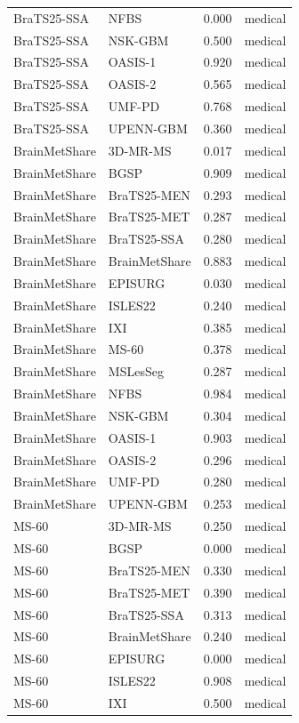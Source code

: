 \begin{tabular}{llrl}
BraTS25-SSA & NFBS & 0.000 & medical \\
BraTS25-SSA & NSK-GBM & 0.500 & medical \\
BraTS25-SSA & OASIS-1 & 0.920 & medical \\
BraTS25-SSA & OASIS-2 & 0.565 & medical \\
BraTS25-SSA & UMF-PD & 0.768 & medical \\
BraTS25-SSA & UPENN-GBM & 0.360 & medical \\
BrainMetShare & 3D-MR-MS & 0.017 & medical \\
BrainMetShare & BGSP & 0.909 & medical \\
BrainMetShare & BraTS25-MEN & 0.293 & medical \\
BrainMetShare & BraTS25-MET & 0.287 & medical \\
BrainMetShare & BraTS25-SSA & 0.280 & medical \\
BrainMetShare & BrainMetShare & 0.883 & medical \\
BrainMetShare & EPISURG & 0.030 & medical \\
BrainMetShare & ISLES22 & 0.240 & medical \\
BrainMetShare & IXI & 0.385 & medical \\
BrainMetShare & MS-60 & 0.378 & medical \\
BrainMetShare & MSLesSeg & 0.287 & medical \\
BrainMetShare & NFBS & 0.984 & medical \\
BrainMetShare & NSK-GBM & 0.304 & medical \\
BrainMetShare & OASIS-1 & 0.903 & medical \\
BrainMetShare & OASIS-2 & 0.296 & medical \\
BrainMetShare & UMF-PD & 0.280 & medical \\
BrainMetShare & UPENN-GBM & 0.253 & medical \\
MS-60 & 3D-MR-MS & 0.250 & medical \\
MS-60 & BGSP & 0.000 & medical \\
MS-60 & BraTS25-MEN & 0.330 & medical \\
MS-60 & BraTS25-MET & 0.390 & medical \\
MS-60 & BraTS25-SSA & 0.313 & medical \\
MS-60 & BrainMetShare & 0.240 & medical \\
MS-60 & EPISURG & 0.000 & medical \\
MS-60 & ISLES22 & 0.908 & medical \\
MS-60 & IXI & 0.500 & medical \\

\end{tabular}
